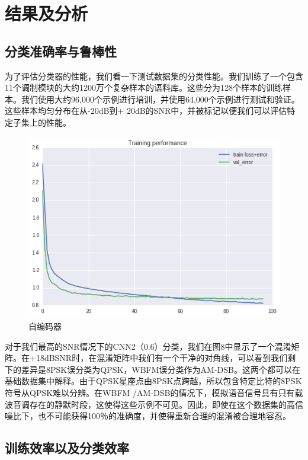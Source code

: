 \section{结果及分析}

\subsection{分类准确率与鲁棒性}
为了评估分类器的性能，我们看一下测试数据集的分类性能。我们训练了一个包含11个调制模块的大约1200万个复杂样本的语料库。这些分为128个样本的训练样本。我们使用大约96,000个示例进行培训，并使用64,000个示例进行测试和验证。 这些样本均匀分布在从-20dB到+ 20dB的SNR中，并被标记以便我们可以评估特定子集上的性能。\par
\begin{figure}[!h]
	\centering
	\includegraphics[scale=0.3]{figures/chapter_3/loss}
	\caption{自编码器}	\label{fig_3_2}
\end{figure}
对于我们最高的SNR情况下的CNN2（0.6）分类，我们在图8中显示了一个混淆矩阵。在+18dBSNR时，在混淆矩阵中我们有一个干净的对角线，可以看到我们剩下的差异是8PSK误分类为QPSK，WBFM误分类作为AM-DSB。这两个都可以在基础数据集中解释。由于QPSK星座点由8PSK点跨越，所以包含特定比特的8PSK符号从QPSK难以分辨。在WBFM /AM-DSB的情况下，模拟语音信号具有只有载波音调存在的静默时段，这使得这些示例不可见。因此，即使在这个数据集的高信噪比下，也不可能获得100％的准确度，并使得重新合理的混淆被合理地容忍。\par

\subsection{训练效率以及分类效率}

